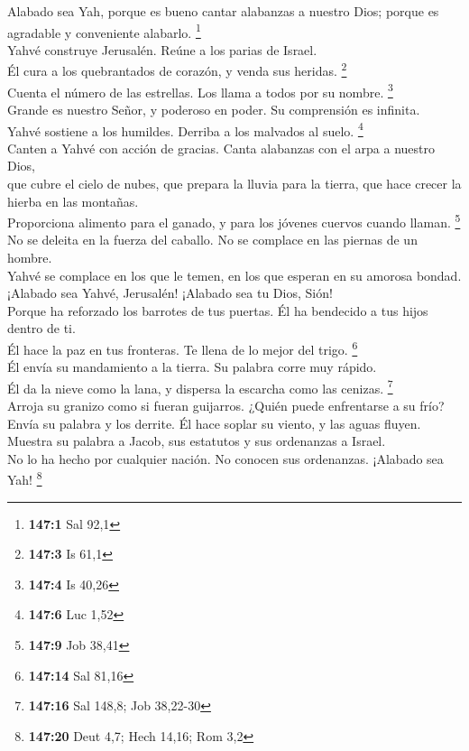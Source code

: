  Alabado sea Yah, porque es bueno cantar alabanzas a
nuestro Dios; porque es agradable y conveniente alabarlo. \footnote{\textbf{147:1}
  Sal 92,1}\\
 Yahvé construye Jerusalén. Reúne a los parias de
Israel.\\
 Él cura a los quebrantados de corazón, y venda sus
heridas. \footnote{\textbf{147:3} Is 61,1}\\
 Cuenta el número de las estrellas. Los llama a todos por
su nombre. \footnote{\textbf{147:4} Is 40,26}\\
 Grande es nuestro Señor, y poderoso en poder. Su
comprensión es infinita.\\
 Yahvé sostiene a los humildes. Derriba a los malvados al
suelo. \footnote{\textbf{147:6} Luc 1,52}\\
 Canten a Yahvé con acción de gracias. Canta alabanzas con
el arpa a nuestro Dios,\\
 que cubre el cielo de nubes, que prepara la lluvia para
la tierra, que hace crecer la hierba en las montañas.\\
 Proporciona alimento para el ganado, y para los jóvenes
cuervos cuando llaman. \footnote{\textbf{147:9} Job 38,41}\\
 No se deleita en la fuerza del caballo. No se complace
en las piernas de un hombre.\\
 Yahvé se complace en los que le temen, en los que
esperan en su amorosa bondad.\\
 ¡Alabado sea Yahvé, Jerusalén! ¡Alabado sea tu Dios,
Sión!\\
 Porque ha reforzado los barrotes de tus puertas. Él ha
bendecido a tus hijos dentro de ti.\\
 Él hace la paz en tus fronteras. Te llena de lo mejor
del trigo. \footnote{\textbf{147:14} Sal 81,16}\\
 Él envía su mandamiento a la tierra. Su palabra corre
muy rápido.\\
 Él da la nieve como la lana, y dispersa la escarcha como
las cenizas. \footnote{\textbf{147:16} Sal 148,8; Job 38,22-30}\\
 Arroja su granizo como si fueran guijarros. ¿Quién puede
enfrentarse a su frío?\\
 Envía su palabra y los derrite. Él hace soplar su
viento, y las aguas fluyen.\\
 Muestra su palabra a Jacob, sus estatutos y sus
ordenanzas a Israel.\\
 No lo ha hecho por cualquier nación. No conocen sus
ordenanzas. ¡Alabado sea Yah! \footnote{\textbf{147:20} Deut 4,7; Hech
  14,16; Rom 3,2}

